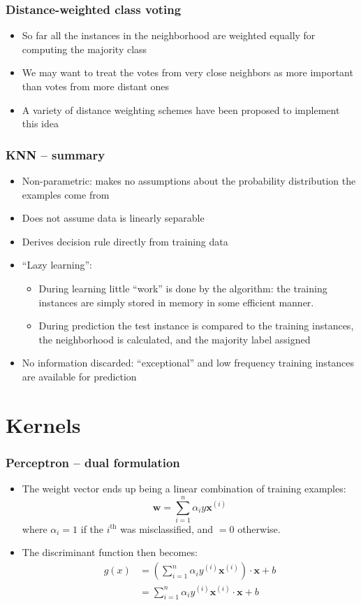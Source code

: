 \documentclass{beamer}
\newcommand{\x}{\mathbf{x}}
\newcommand{\w}{\mathbf{w}}
\begin{document}
\begin{frame}
 \frametitle{Distance-weighted class voting}
\begin{itemize}
\item So far all the instances in the neighborhood are weighted
  equally for computing the majority class
\item We may want to treat the votes from very close neighbors as more
  important than votes from more distant ones
\item A variety of distance weighting schemes have been proposed to
  implement this idea
\end{itemize}
\end{frame}


\begin{frame}
 \frametitle{KNN -- summary}
\begin{itemize}
\item Non-parametric: makes no assumptions about the probability
  distribution the examples come from
\item Does not assume data is linearly separable
\item Derives decision rule directly from training data
\item ``Lazy learning'':
\begin{itemize}
\item During learning little ``work'' is done by the algorithm: the
  training instances are simply stored in memory in some efficient
  manner.
\item During prediction the test instance is compared to the training
  instances, the neighborhood is calculated, and the majority label
  assigned
\end{itemize}

\item No information discarded: ``exceptional'' and low frequency
  training instances are available for prediction
\end{itemize}
\end{frame}


\section{Kernels}
\begin{frame}
 \frametitle{Perceptron -- dual formulation}
\begin{itemize}
\item The weight vector ends up being a linear
  combination of training examples:
\[
 \w = \sum_{i=1}^n \alpha_i y\x^{(i)}
\]
where $\alpha_i = 1$ if the $i^{\text{th}}$ was misclassified, and
$=0$ otherwise.
\item The discriminant function then becomes:
\begin{align}
 g(x) & = \left(\sum_{i=1}^n \alpha_i y^{(i)} \x^{(i)}\right) \cdot \x + b \\
      & = \sum_{i=1}^n \alpha_i y^{(i)} \x^{(i)}\cdot\x + b
\end{align}
\end{itemize}
\end{frame}
\end{document}
